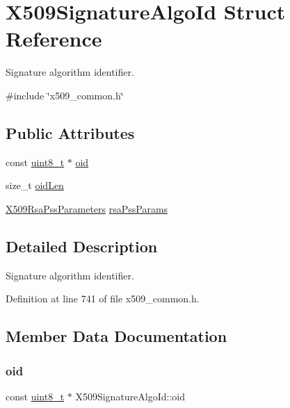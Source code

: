 \hypertarget{structX509SignatureAlgoId}{}\section{X509\+Signature\+Algo\+Id Struct Reference}
\label{structX509SignatureAlgoId}


Signature algorithm identifier.  




{\ttfamily \#include \char`\"{}x509\+\_\+common.\+h\char`\"{}}

\subsection*{Public Attributes}
\begin{DoxyCompactItemize}
\item 
const \hyperlink{stdint_8h_aba7bc1797add20fe3efdf37ced1182c5}{uint8\+\_\+t} $\ast$ \hyperlink{structX509SignatureAlgoId_a98ec1f180733e1e0cc22b133f8a23416}{oid}
\item 
size\+\_\+t \hyperlink{structX509SignatureAlgoId_a4a15b78049b8e360a069b72f0c79b0f4}{oid\+Len}
\item 
\hyperlink{structX509RsaPssParameters}{X509\+Rsa\+Pss\+Parameters} \hyperlink{structX509SignatureAlgoId_aabb448030d8783d06739cdd2c660dde4}{rsa\+Pss\+Params}
\end{DoxyCompactItemize}


\subsection{Detailed Description}
Signature algorithm identifier. 

Definition at line 741 of file x509\+\_\+common.\+h.



\subsection{Member Data Documentation}
\mbox{\label{structX509SignatureAlgoId_a98ec1f180733e1e0cc22b133f8a23416}} 
\subsubsection{\texorpdfstring{oid}{oid}}
{\footnotesize\ttfamily const \hyperlink{stdint_8h_aba7bc1797add20fe3efdf37ced1182c5}{uint8\+\_\+t} $\ast$ X509\+Signature\+Algo\+Id\+::oid}



